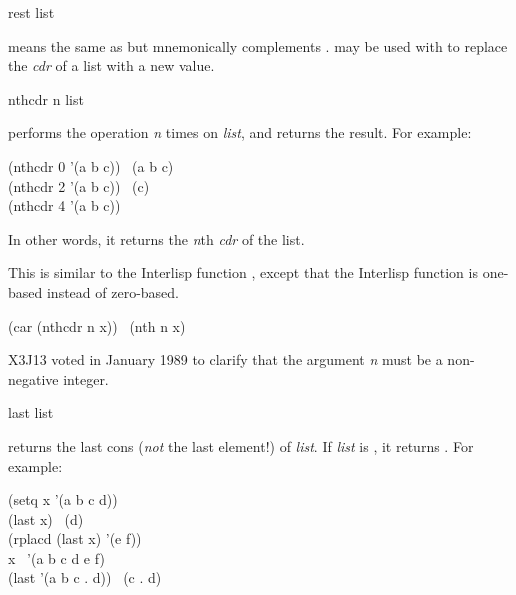 \begin{defun}[Function]
rest list

 means the same as  but mnemonically complements .
 may be used with  to replace the {\it cdr} of a list
with a new value.
\end{defun}

\begin{defun}[Function]
nthcdr n list

 performs the  operation {\it n} times
on {\it list}, and returns the result.
For example:
\begin{lisp}
(nthcdr 0 '(a b c)) \EV\ (a b c) \\
(nthcdr 2 '(a b c)) \EV\ (c) \\
(nthcdr 4 '(a b c)) \EV\ {\empty}
\end{lisp}
In other words, it returns the {\it n}th {\it cdr} of the list.

\beforenoterule
\begin{incompatibility}
This is similar to the Interlisp function ,
except that the Interlisp function is one-based instead of zero-based.
\end{incompatibility}
\afternoterule

\begin{lisp}
(car (nthcdr n x)) \EQ\ (nth n x)
\end{lisp}
\begin{new}
X3J13 voted in January 1989
to clarify that the argument {\it n}
must be a non-negative integer.
\end{new}

\end{defun}

\begin{obsolete}
\begin{defun}[Function]
last list

 returns the last cons ({\it not} the last element!) of {\it list}.
If {\it list} is {\empty}, it returns {\empty}.
For example:
\begin{lisp}
(setq x '(a b c d)) \\
(last x) \EV\ (d) \\
(rplacd (last x) '(e f)) \\
x \EV\ '(a b c d e f) \\
(last '(a b c . d)) \EV\ (c . d)
\end{lisp}
\end{defun}
\end{obsolete}

